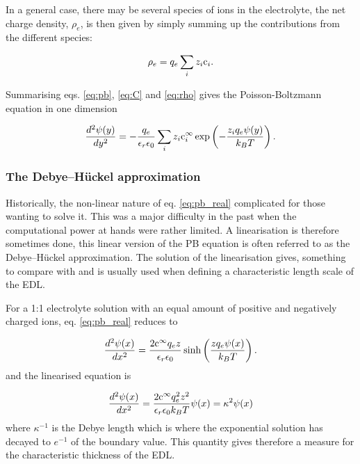 In a general case, there may be several species of ions in the
electrolyte, the net charge density, $\rho_e$, is then given by simply
summing up the contributions from the different species:

\begin{equation}\label{eq:rho}
\rho_e = q_e\sum_i z_i \mathrm{c}_i.
\end{equation}

Summarising eqs. \eqref{eq:pb}, \eqref{eq:C} and \eqref{eq:rho} gives
the Poisson-Boltzmann equation in one dimension

\begin{equation}\label{eq:pb_real}
\dfrac{d^2\mathrm{\psi}(y)}{dy^2} = -\frac{q_e}{\epsilon_r \epsilon_0}\sum_i z_i
\mathrm{c}_i^{\infty} \exp\left(-\frac{z_i q_e \mathrm{\psi}(y)}{k_BT}\right).
\end{equation}

\subsubsection{The Debye–Hückel approximation}
Historically, the non-linear nature of eq. \eqref{eq:pb_real}
complicated for those wanting to solve it. This was a major difficulty
in the past when the computational power at hands were rather
limited. A linearisation is therefore sometimes done, this linear
version of the PB equation is often referred to as the Debye–Hückel
approximation. The solution of the linearisation gives, something to
compare with and is usually used when defining a characteristic length
scale of the EDL.

For a 1:1 electrolyte solution with an equal amount of positive and
negatively charged ions, eq. \eqref{eq:pb_real} reduces to

\begin{equation}
\frac{d^2\psi(x)}{dx^2} = \frac{2\mathrm{c}^{\infty}q_ez}{\epsilon_r
  \epsilon_0}
\sinh\left(\frac{z q_e \psi(x)}{k_BT}\right).
\end{equation}
and the linearised equation is

\begin{equation}
\frac{d^2\psi(x)}{dx^2} = \frac{2\mathrm{c}^{\infty}q_e^2z^2}{\epsilon_r
  \epsilon_0 k_B T} \psi(x) = \kappa^2 \psi(x)
\end{equation}
where $\kappa^{-1}$ is the Debye length which is where the exponential
solution has decayed to $e^{-1}$ of the boundary value. This quantity
gives therefore a measure for the characteristic thickness of the EDL.


